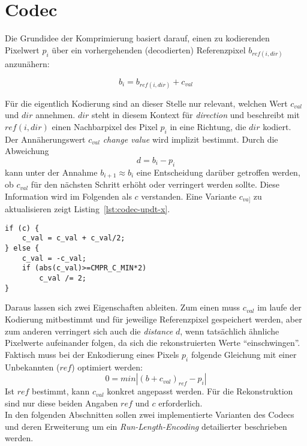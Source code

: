 
\chapter{Codec}


Die Grundidee der Komprimierung basiert darauf, einen zu kodierenden Pixelwert
$p_{i}$  \"uber ein vorhergehenden (decodierten) Referenzpixel $b_{ref(i,dir)}$ anzun\"ahern:

\begin{equation}
    b_i = b_{ref(i,dir)} + c_{val}
\label{form:enc-basic}
\end{equation}

F\"ur die eigentlich Kodierung sind an dieser Stelle nur relevant, welchen Wert
$c_{val}$ und $dir$ annehmen. $dir$ steht in diesem Kontext f\"ur \textit{direction} und
beschreibt mit $ref(i,dir)$ einen Nachbarpixel des Pixel $p_i$ in eine Richtung,
die $dir$ kodiert. Der Ann\"aherungswert $c_{val}$ \textit{change value} wird implizit 
bestimmt. Durch die Abweichung
\begin{equation}
    d = b_i - p_i
\label{form:enc-dist}
\end{equation}
kann unter der Annahme $b_{i+1} \approx b_i$ eine Entscheidung dar\"uber getroffen 
werden, ob $c_{val}$ f\"ur den n\"achsten Schritt erh\"oht oder verringert werden
sollte. Diese Information wird im Folgenden als $c$ verstanden. Eine Variante
$c_{va]}$ zu aktualisieren zeigt Listing~\ref{lst:codec-updt-x}.
%
\begin{lstlisting}[caption=Aktualisierung von $c_{val}$ anhand des $c$-Flags,%
                   label=lst:codec-updt-x]
if (c) {
    c_val = c_val + c_val/2;
} else {
    c_val = -c_val;
    if (abs(c_val)>=CMPR_C_MIN*2) 
        c_val /= 2;
}
\end{lstlisting}
%
Daraus lassen sich  zwei Eigenschaften ableiten. Zum einen muss $c_{val}$ im
laufe der Kodierung mitbestimmt und f\"ur jeweilige Referenzpixel gespeichert werden, aber
zum anderen verringert sich auch die \textit{distance} $d$, wenn tats\"achlich
\"ahnliche Pixelwerte aufeinander folgen, da sich die rekonstruierten Werte
``einschwingen''.
Faktisch muss bei der Enkodierung eines Pixels $p_i$ folgende Gleichung mit
einer Unbekannten ($ref$) optimiert werden:
\begin{equation}
0 = {min}| (b + c_{val})_{ref} - p_{i}|
\label{form:codec}
\end{equation}
Ist $ref$ bestimmt, kann $c_{val}$ konkret angepasst werden. F\"ur die Rekonstruktion
sind nur diese beiden Angaben $ref$ und $c$ erforderlich.\\
In den folgenden Abschnitten sollen zwei implementierte Varianten des Codecs und
deren Erweiterung um ein \textit{Run-Length-Encoding} detailierter beschrieben werden. 
%
%
%
%
